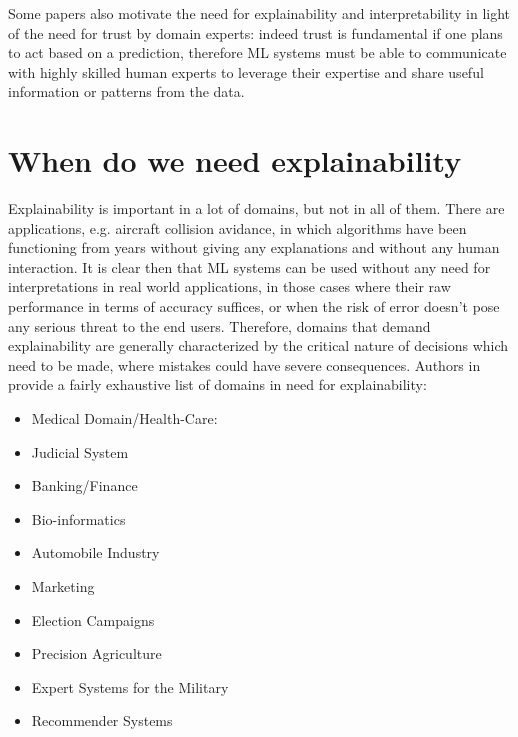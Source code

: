 Some papers \cite{Kim2015InteractiveAI, ribeiro2016trust} also motivate the need for explainability and interpretability in light of the need for trust by domain experts: indeed trust is fundamental if one plans to act based on a prediction, therefore ML systems must be able to communicate with highly skilled human experts to leverage their expertise and share useful information or patterns from the data. 
\section{When do we need explainability}
Explainability is important in a lot of domains, but not in all of them. There are applications, e.g. aircraft collision avidance, in which algorithms have been functioning from years without giving any explanations and without any human interaction. It is clear then that ML systems can be used without any need for interpretations in real world applications, in those cases where their raw performance in terms of accuracy suffices, or when the risk of error doesn't pose any serious threat to the end users. Therefore, domains that demand explainability are generally characterized by the critical nature of decisions which need to be made, where mistakes could have severe consequences. Authors in \cite{burkart2021survey} provide a fairly exhaustive list of domains in need for explainability:
\begin{itemize}
	\item Medical Domain/Health-Care: 
	\item Judicial System
	\item Banking/Finance
	\item Bio-informatics
	\item Automobile Industry
	\item Marketing
	\item Election Campaigns
	\item Precision Agriculture
	\item Expert Systems for the Military
	\item Recommender Systems
\end{itemize}
